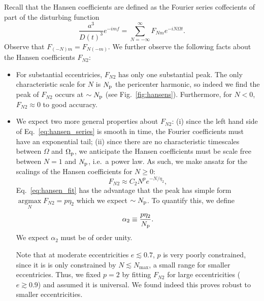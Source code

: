 \documentclass[
        fleqn,
        usenatbib,
        referee,
    ]{mnras}
\DeclareMathOperator*{\argmax}{argmax}
\begin{document}
Recall that the Hansen coefficients are defined as the Fourier series coffecients
of part of the disturbing function
\begin{equation}
    \frac{a^3}{D(t)^3} e^{-imf} = \sum\limits_{N = -\infty}^\infty
        F_{Nm} e^{-iN\Omega t}.\label{eq:hansen_series}
\end{equation}
Observe that $F_{(-N)m} = F_{N(-m)}$. We further observe the following facts about
the Hansen coefficients $F_{N2}$:
\begin{itemize}
    \item For substantial eccentricies, $F_{N2}$ has only one substantial peak.
        The only characteristic scale for $N$ is $N_{\rm p}$ the pericenter
        harmonic, so indeed we find the peak of $F_{N2}$ occurs at $\sim N_{\rm
        p}$ (see Fig.~\ref{fig:hansens}). Furthermore, for $N < 0$, $F_{N2}
        \approx 0$ to good accuracy.

    \item We expect two more general properties about $F_{N2}$: (i) since the
        left hand side of Eq.~\eqref{eq:hansen_series} is smooth in time, the
        Fourier coefficients must have an exponential tail; (ii) since there are
        no characteristic timescales between $\Omega$ and $\Omega_{\rm p}$, we
        anticipate the Hansen coefficients must be scale free between $N = 1$
        and $N_{\rm p}$, i.e.\ a power law. As such, we make ansatz for the
        scalings of the Hansen coefficients for $N \geq 0$:
        \begin{equation}
            F_{N2} \approx C_2 N^{p}e^{-N/\eta_2},\label{eq:hansen_fit}
        \end{equation}
        Eq.~\eqref{eq:hansen_fit} has the advantage that the peak has simple
        form $\argmax\limits_N F_{N2} = p\eta_2$ which we expect $\sim N_{\rm p}$.
        To quantify this, we define
        \begin{equation}
            \alpha_{2} \equiv \frac{p\eta_2}{N_{\rm p}}.\label{eq:alpha2_def}
        \end{equation}
        We expect $\alpha_{{2}}$ must be of order unity.

        Note that at moderate eccentricities $e \lesssim 0.7$, $p$ is very
        poorly constrained, since it is is only constrained by $N \lesssim
        N_{\max}$, a small range for smaller eccentricies. Thus, we fixed $p =
        2$ by fitting $F_{N2}$ for large eccentricities ($e \gtrsim 0.9$) and
        assumed it is universal. We found indeed this proves robust to smaller
        eccentricities.
\end{itemize}
\end{document}
